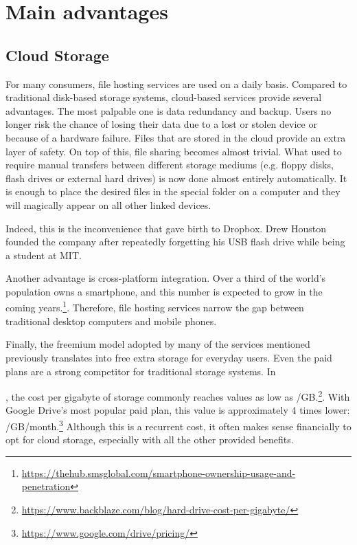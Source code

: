 \section{Main advantages}

\subsection{Cloud Storage}

For many consumers, file hosting services are used on a daily basis. Compared to traditional disk-based storage systems, cloud-based services provide several advantages. The most palpable one is data redundancy and backup. Users no longer risk the chance of losing their data due to a lost or stolen device or because of a hardware failure. Files that are stored in the cloud provide an extra layer of safety. On top of this, file sharing becomes almost trivial. What used to require manual transfers between different storage mediums (e.g. floppy disks, flash drives or external hard drives) is now done almost entirely automatically. It is enough to place the desired files in the special folder on a computer and they will magically appear on all other linked devices.

Indeed, this is the inconvenience that gave birth to Dropbox. Drew Houston founded the company after repeatedly forgetting his USB flash drive while being a student at MIT.

Another advantage is cross-platform integration. Over a third of the world's population owns a smartphone, and this number is expected to grow in the coming years.\footnote{\url{https://thehub.smsglobal.com/smartphone-ownership-usage-and-penetration}}. Therefore, file hosting services narrow the gap between traditional desktop computers and mobile phones.

Finally, the freemium model adopted by many of the services mentioned previously translates into free extra storage for everyday users. Even the paid plans are a strong competitor for traditional storage systems. In \date{2018}, the cost per gigabyte of storage commonly reaches values as low as \mbox{\slash GB}.\footnote{\url{https://www.backblaze.com/blog/hard-drive-cost-per-gigabyte/}}. With Google Drive's most popular paid plan, this value is approximately 4 times lower: \mbox{\slash GB\slash month}.\footnote{\url{https://www.google.com/drive/pricing/}} Although this is a recurrent cost, it often makes sense financially to opt for cloud storage, especially with all the other provided benefits.

